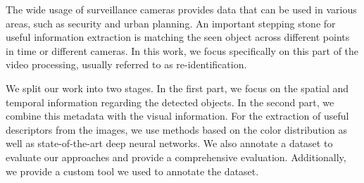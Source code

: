 \documentclass[12pt]{report}
\begin{document}

The wide usage of surveillance cameras provides data that can be used in various areas, such as security and urban planning. An important stepping stone for useful information extraction is matching the seen object across different points in time or different cameras. In this work, we focus specifically on this part of the video processing, usually referred to as re-identification.

We split our work into two stages. In the first part, we focus on the spatial and temporal information regarding the detected objects. In the second part, we combine this metadata with the visual information. For the extraction of useful descriptors from the images, we use methods based on the color distribution as well as state-of-the-art deep neural networks. We also annotate a dataset to evaluate our approaches and provide a comprehensive evaluation. Additionally, we provide a custom tool we used to annotate the dataset.
\end{document}
